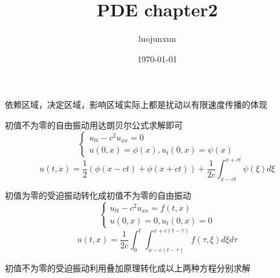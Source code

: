 \documentclass[12pt, a4paper, oneside]{ctexart}
\title{\huge\textbf{PDE chapter2}}
\author{luojunxun}
\date{\today}
\begin{document}
\maketitle
依赖区域，决定区域，影响区域实际上都是扰动以有限速度传播的体现

初值不为零的自由振动用达朗贝尔公式求解即可
$$\begin{cases}
u_{tt}-c^2u_{xx}=0 \\
u(0,x)=\phi(x),u_t(0,x)=\psi(x)
\end{cases}$$
$$u(t,x)=\frac{1}{2}(\phi(x-ct)+\phi(x+ct))+\frac{1}{2c}\int_{x-ct}^{x+ct}\psi(\xi)d\xi $$

初值为零的受迫振动转化成初值不为零的自由振动
$$\begin{cases}
u_{tt}-c^2u_{xx}=f(t,x)\\
u(0,x)=0,u_t(0,x)=0
\end{cases}$$
$$u(t,x)=\frac{1}{2c}\int_0^t\int_{x-c(t-\tau)}^{x+c(t-\tau)}f(\tau,\xi)d\xi d\tau $$

初值不为零的受迫振动利用叠加原理转化成以上两种方程分别求解














% 
% 
\end{document}
